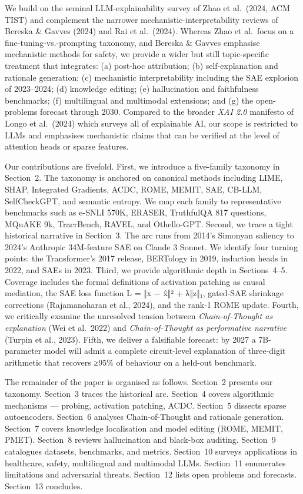 We build on the seminal LLM-explainability survey of Zhao et al.~(2024, ACM TIST) and complement the narrower mechanistic-interpretability reviews of Bereska \& Gavves (2024) and Rai et al.~(2024). Whereas Zhao et al.~focus on a fine-tuning-vs.-prompting taxonomy, and Bereska \& Gavves emphasise mechanistic methods for safety, we provide a wider but still topic-specific treatment that integrates: (a) post-hoc attribution; (b) self-explanation and rationale generation; (c) mechanistic interpretability including the SAE explosion of 2023--2024; (d) knowledge editing; (e) hallucination and faithfulness benchmarks; (f) multilingual and multimodal extensions; and (g) the open-problems forecast through 2030. Compared to the broader \emph{XAI 2.0} manifesto of Longo et al.~(2024) which surveys all of explainable AI, our scope is restricted to LLMs and emphasises mechanistic claims that can be verified at the level of attention heads or sparse features.

Our contributions are fivefold. First, we introduce a five-family taxonomy in Section~2. The taxonomy is anchored on canonical methods including LIME, SHAP, Integrated Gradients, ACDC, ROME, MEMIT, SAE, CB-LLM, SelfCheckGPT, and semantic entropy. We map each family to representative benchmarks such as e-SNLI 570K, ERASER, TruthfulQA 817 questions, MQuAKE 9k, TracrBench, RAVEL, and Othello-GPT. Second, we trace a tight historical narrative in Section~3. The arc runs from 2014's Simonyan saliency to 2024's Anthropic 34M-feature SAE on Claude 3 Sonnet. We identify four turning points: the Transformer's 2017 release, BERTology in 2019, induction heads in 2022, and SAEs in 2023. Third, we provide algorithmic depth in Sections~4--5. Coverage includes the formal definitions of activation patching as causal mediation, the SAE loss function L = ‖x − x̂‖² + λ‖z‖₁, gated-SAE shrinkage corrections (Rajamanoharan et al., 2024), and the rank-1 ROME update. Fourth, we critically examine the unresolved tension between \emph{Chain-of-Thought as explanation} (Wei et al.~2022) and \emph{Chain-of-Thought as performative narrative} (Turpin et al., 2023). Fifth, we deliver a falsifiable forecast: by 2027 a 7B-parameter model will admit a complete circuit-level explanation of three-digit arithmetic that recovers ≥95\% of behaviour on a held-out benchmark.

The remainder of the paper is organised as follows. Section~2 presents our taxonomy. Section~3 traces the historical arc. Section~4 covers algorithmic mechanisms --- probing, activation patching, ACDC. Section~5 dissects sparse autoencoders. Section~6 analyses Chain-of-Thought and rationale generation. Section~7 covers knowledge localisation and model editing (ROME, MEMIT, PMET). Section~8 reviews hallucination and black-box auditing. Section~9 catalogues datasets, benchmarks, and metrics. Section~10 surveys applications in healthcare, safety, multilingual and multimodal LLMs. Section~11 enumerates limitations and adversarial threats. Section~12 lists open problems and forecasts. Section~13 concludes.

